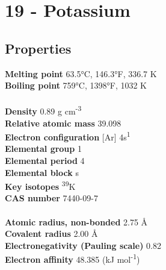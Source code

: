\section{19 - Potassium}
\label{sec:elem-potassium}
\subsection{Properties}
\textbf{Melting point} 63.5°C, 146.3°F, 336.7 K\\
\textbf{Boiling point} 759°C, 1398°F, 1032 K\\
\\
\textbf{Density} 0.89 g cm\textsuperscript{-3}\\
\textbf{Relative atomic mass} 39.098\\
\textbf{Electron configuration} [Ar] 4s\textsuperscript{1}\\
\textbf{Elemental group} 1\\
\textbf{Elemental period} 4\\
\textbf{Elemental block} s\\
\textbf{Key isotopes} \textsuperscript{39}K\\
\textbf{CAS number} 7440-09-7\\
\\
\textbf{Atomic radius, non-bonded} 2.75 Å\\
\textbf{Covalent radius} 2.00 Å\\
\textbf{Electronegativity (Pauling scale)} 0.82\\
\textbf{Electron affinity} 48.385 (kJ mol\textsuperscript{-1})\\